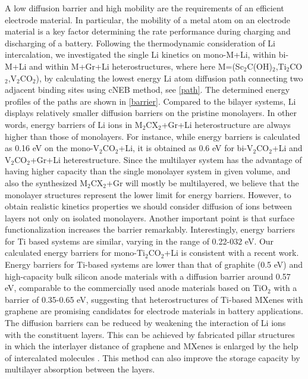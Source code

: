 A low diffusion barrier and high mobility are the requirements of an efficient electrode material. In particular, the mobility of a metal atom on an electrode material is a key factor determining the rate performance during charging and discharging of a battery. Following the thermodynamic consideration of Li intercalation, we investigated the single Li kinetics on mono-M+Li, within bi-M+Li and within M+Gr+Li heterostructures, where here M=(Sc$_2$C(OH)$_2$,Ti$_2$CO$_2$,V$_2$CO$_2$), by calculating the lowest energy Li atom diffusion path connecting two adjacent binding sites using cNEB method, see \autoref{path}. The determined energy profiles of the paths are shown in \autoref{barrier}. 
Compared to the bilayer systems, Li displays relatively smaller diffusion barriers on the pristine monolayers. In other words, energy barriers of Li ions in M$_2$CX$_2$+Gr+Li heterostructure are always higher than those of monolayers. For instance, while energy barriers is calculated as 0.16 eV on the mono-V$_2$CO$_2$+Li, it is obtained as 0.6 eV for bi-V$_2$CO$_2$+Li and V$_2$CO$_2$+Gr+Li heterestructure. Since the multilayer system has the advantage of having higher capacity than the single monolayer system in given volume, and also the synthesized M$_2$CX$_2$+Gr will mostly be multilayered, we believe that the monolayer structures represent the lower limit for energy barriers. However, to obtain realistic kinetics properties we should consider diffusion of ions between layers not only on isolated monolayers. Another important point is that surface functionalization increases the barrier remarkably\cite{doi:10.1021/jp504493a}. Interestingly, energy barriers for Ti based systems are similar, varying in the range of 0.22-032 eV.  Our calculated energy barriers for mono-Ti$_2$CO$_2$+Li is consistent with a recent work\cite{doi:10.1021/jp504493a}. Energy barriers for Ti-based systems are lower than that of graphite (0.5 eV)\cite{Thinius2014} and high-capacity bulk silicon anode materials with a diffusion barrier around 0.57 eV, comparable to the commercially used anode materials based on TiO$_2$ with a barrier of 0.35-0.65 eV\cite{tio2-barrier,tio2-barrier-4,tio2-barrier-3}, suggesting that heterostructures of Ti-based MXenes with graphene are promising candidates for electrode materials in battery applications. The diffusion barriers can be reduced by weakening the interaction of Li ions with the constituent layers. This can be achieved by fabricated pillar structures in which the interlayer distance of graphene and MXenes is enlarged by the help of intercalated molecules \cite{Luo2017}. This method can also improve the storage capacity by multilayer absorption between the layers. 



